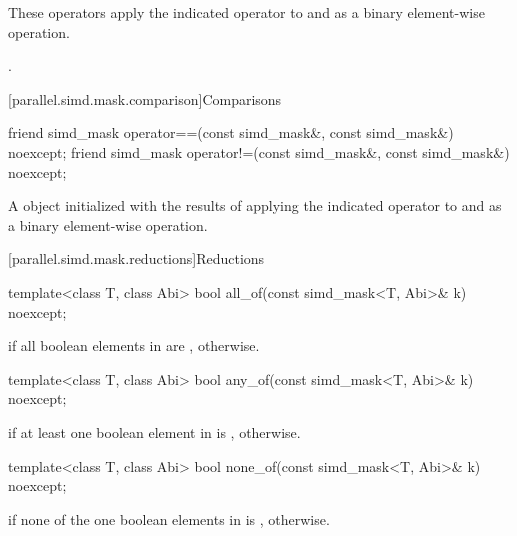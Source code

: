 \begin{itemdescr}
  \pnum\effects
  These operators apply the indicated operator to  and  as a binary element-wise operation.

  \pnum\returns
  .
\end{itemdescr}

[parallel.simd.mask.comparison]{Comparisons}

\begin{itemdecl}
friend simd_mask operator==(const simd_mask&, const simd_mask&) noexcept;
friend simd_mask operator!=(const simd_mask&, const simd_mask&) noexcept;
\end{itemdecl}

\begin{itemdescr}
  \pnum\returns
  A  object initialized with the results of applying the indicated operator to  and  as a binary element-wise operation.
\end{itemdescr}

[parallel.simd.mask.reductions]{Reductions}

\begin{itemdecl}
template<class T, class Abi> bool all_of(const simd_mask<T, Abi>& k) noexcept;
\end{itemdecl}

\begin{itemdescr}
  \pnum\returns
   if all boolean elements in  are ,  otherwise.
\end{itemdescr}

\begin{itemdecl}
template<class T, class Abi> bool any_of(const simd_mask<T, Abi>& k) noexcept;
\end{itemdecl}

\begin{itemdescr}
  \pnum\returns
   if at least one boolean element in  is ,  otherwise.
\end{itemdescr}

\begin{itemdecl}
template<class T, class Abi> bool none_of(const simd_mask<T, Abi>& k) noexcept;
\end{itemdecl}

\begin{itemdescr}
  \pnum\returns
   if none of the one boolean elements in  is ,  otherwise.
\end{itemdescr}

